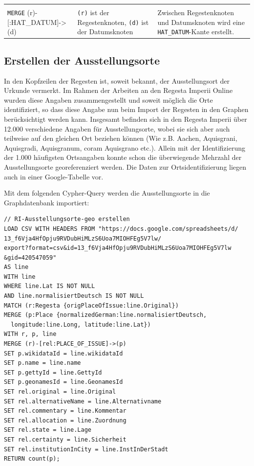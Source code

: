 \documentclass[ngerman,]{scrreprt}
\begin{document}
\begin{longtable}[]{@{}lll@{}}
\begin{minipage}[t]{0.37\columnwidth}
\end{minipage}\tabularnewline
\begin{minipage}[t]{0.31\columnwidth}\raggedright
\texttt{MERGE} (r)-{[}:HAT\_DATUM{]}-\textgreater{}(d)\strut
\end{minipage} & \begin{minipage}[t]{0.23\columnwidth}\raggedright
\texttt{(r)} ist der Regestenknoten, \texttt{(d)} ist der Datumsknoten\strut
\end{minipage} & \begin{minipage}[t]{0.37\columnwidth}\raggedright
Zwischen Regestenknoten und Datumsknoten wird eine \texttt{HAT\_DATUM}-Kante erstellt.\strut
\end{minipage}\tabularnewline
\bottomrule
\end{longtable}

\hypertarget{erstellen-der-ausstellungsorte}{%
\subsection{Erstellen der Ausstellungsorte}\label{erstellen-der-ausstellungsorte}}

In den Kopfzeilen der Regesten ist, soweit bekannt, der Ausstellungsort der Urkunde vermerkt. Im Rahmen der Arbeiten an den Regesta Imperii Online wurden diese Angaben zusammengestellt und soweit möglich die Orte identifiziert, so dass diese Angabe nun beim Import der Regesten in den Graphen berücksichtigt werden kann. Insgesamt befinden sich in den Regesta Imperii über 12.000 verschiedene Angaben für Ausstellungsorte, wobei sie sich aber auch teilweise auf den gleichen Ort beziehen können (Wie z.B. Aachen, Aquisgrani, Aquisgradi, Aquisgranum, coram Aquisgrano etc.). Allein mit der Identifizierung der 1.000 häufigsten Ortsangaben konnte schon die überwiegende Mehrzahl der Ausstellungsorte georeferenziert werden. Die Daten zur Ortsidentifizierung liegen auch in einer Google-Tabelle vor.

Mit dem folgenden Cypher-Query werden die Ausstellungsorte in die Graphdatenbank importiert:

\begin{verbatim}
// RI-Ausstellungsorte-geo erstellen
LOAD CSV WITH HEADERS FROM "https://docs.google.com/spreadsheets/d/
13_f6Vja4HfOpju9RVDubHiMLzS6Uoa7MIOHFEg5V7lw/
export?format=csv&id=13_f6Vja4HfOpju9RVDubHiMLzS6Uoa7MIOHFEg5V7lw
&gid=420547059"
AS line
WITH line
WHERE line.Lat IS NOT NULL
AND line.normalisiertDeutsch IS NOT NULL
MATCH (r:Regesta {origPlaceOfIssue:line.Original})
MERGE (p:Place {normalizedGerman:line.normalisiertDeutsch,
  longitude:line.Long, latitude:line.Lat})
WITH r, p, line
MERGE (r)-[rel:PLACE_OF_ISSUE]->(p)
SET p.wikidataId = line.wikidataId
SET p.name = line.name
SET p.gettyId = line.GettyId
SET p.geonamesId = line.GeonamesId
SET rel.original = line.Original
SET rel.alternativeName = line.Alternativname
SET rel.commentary = line.Kommentar
SET rel.allocation = line.Zuordnung
SET rel.state = line.Lage
SET rel.certainty = line.Sicherheit
SET rel.institutionInCity = line.InstInDerStadt
RETURN count(p);
\end{verbatim}
\end{document}
